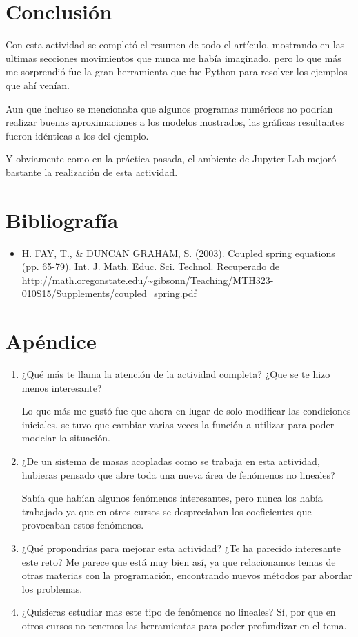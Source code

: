 \documentclass{article}
\begin{document}
\section{Conclusión}
Con esta actividad se completó el resumen de todo el artículo, mostrando en las ultimas secciones movimientos que nunca me había imaginado, pero lo que más me sorprendió fue la gran herramienta que fue Python para resolver los ejemplos que ahí venían.

Aun que incluso se mencionaba que algunos programas numéricos no podrían realizar buenas aproximaciones a los modelos mostrados, las gráficas resultantes fueron idénticas a los del ejemplo.

Y obviamente como en la práctica pasada, el ambiente de Jupyter Lab mejoró bastante la realización de esta actividad.
\section{Bibliografía}
\begin{itemize}
\item H. FAY, T., \& DUNCAN GRAHAM, S. (2003). Coupled spring equations (pp. 65-79). Int. J. Math. Educ. Sci. Technol. Recuperado de \url{http://math.oregonstate.edu/~gibsonn/Teaching/MTH323-010S15/Supplements/coupled_spring.pdf}
\end{itemize}

\section{Apéndice}
\begin{enumerate}
\item ¿Qué más te llama la atención de la actividad completa? ¿Que se te hizo menos interesante?

Lo que más me gustó fue que ahora en lugar de solo modificar las condiciones iniciales, se tuvo que cambiar varias veces la función a utilizar para poder modelar la situación.
\item ¿De un sistema de masas acopladas como se trabaja en esta actividad, hubieras pensado que abre toda una nueva área de fenómenos no lineales?

Sabía que habían algunos fenómenos interesantes, pero nunca los había trabajado ya que en otros cursos se despreciaban los coeficientes que provocaban estos fenómenos.

\item ¿Qué propondrías para mejorar esta actividad? ¿Te ha parecido interesante este reto?
Me parece que está muy bien así, ya que relacionamos temas de otras materias con la programación, encontrando nuevos métodos par abordar los problemas.

\item ¿Quisieras estudiar mas este tipo de fenómenos no lineales?
Sí, por que en otros cursos no tenemos las herramientas para poder profundizar en el tema.

\end{enumerate}
\end{document}
